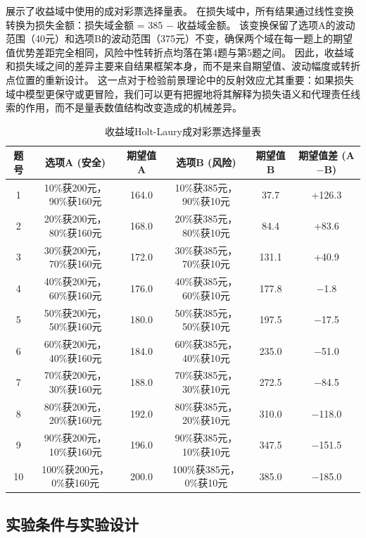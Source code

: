展示了收益域中使用的成对彩票选择量表。
在损失域中，所有结果通过线性变换转换为损失金额：损失域金额 = 385 $-$ 收益域金额。
该变换保留了选项A的波动范围（40元）和选项B的波动范围（375元）不变，确保两个域在每一题上的期望值优势差距完全相同，风险中性转折点均落在第4题与第5题之间。
因此，收益域和损失域之间的差异主要来自结果框架本身，而不是来自期望值、波动幅度或转折点位置的重新设计。
这一点对于检验前景理论中的反射效应尤其重要：如果损失域中模型更保守或更冒险，我们可以更有把握地将其解释为损失语义和代理责任线索的作用，而不是量表数值结构改变造成的机械差异。

\begin{table}[tb]
  \caption{收益域Holt-Laury成对彩票选择量表}
  \label{tab:hl_gain}
  \centering
  \footnotesize
  \setlength{\tabcolsep}{8pt}
  \begin{tabular}{cccccc}
    \toprule
    题号 & 选项A (安全) & 期望值 A & 选项B (风险) & 期望值 B & 期望值差 (A$-$B) \\
    \midrule
    1 & 10\%获200元，90\%获160元 & 164.0 & 10\%获385元，90\%获10元 & 37.7 & +126.3 \\
    2 & 20\%获200元，80\%获160元 & 168.0 & 20\%获385元，80\%获10元 & 84.4 & +83.6 \\
    3 & 30\%获200元，70\%获160元 & 172.0 & 30\%获385元，70\%获10元 & 131.1 & +40.9 \\
    4 & 40\%获200元，60\%获160元 & 176.0 & 40\%获385元，60\%获10元 & 177.8 & $-$1.8 \\
    5 & 50\%获200元，50\%获160元 & 180.0 & 50\%获385元，50\%获10元 & 197.5 & $-$17.5 \\
    6 & 60\%获200元，40\%获160元 & 184.0 & 60\%获385元，40\%获10元 & 235.0 & $-$51.0 \\
    7 & 70\%获200元，30\%获160元 & 188.0 & 70\%获385元，30\%获10元 & 272.5 & $-$84.5 \\
    8 & 80\%获200元，20\%获160元 & 192.0 & 80\%获385元，20\%获10元 & 310.0 & $-$118.0 \\
    9 & 90\%获200元，10\%获160元 & 196.0 & 90\%获385元，10\%获10元 & 347.5 & $-$151.5 \\
    10 & 100\%获200元，0\%获160元 & 200.0 & 100\%获385元，0\%获10元 & 385.0 & $-$185.0 \\
    \bottomrule
  \end{tabular}
\end{table}

\subsection{实验条件与实验设计}

